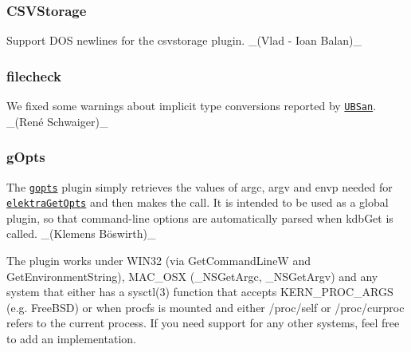 \subsubsection*{C\+S\+V\+Storage}


\begin{DoxyItemize}
\item Support D\+OS newlines for the csvstorage plugin. \+\_\+(Vlad -\/ Ioan Balan)\+\_\+
\end{DoxyItemize}

\subsubsection*{filecheck}


\begin{DoxyItemize}
\item We fixed some warnings about implicit type conversions reported by \href{https://clang.llvm.org/docs/UndefinedBehaviorSanitizer.html}{\tt U\+B\+San}. \+\_\+(René Schwaiger)\+\_\+
\end{DoxyItemize}

\subsubsection*{g\+Opts}


\begin{DoxyItemize}
\item The \href{https://www.libelektra.org/plugins/gopts}{\tt gopts} plugin simply retrieves the values of {\ttfamily argc}, {\ttfamily argv} and {\ttfamily envp} needed for \href{https://www.libelektra.org/tutorials/command-line-options}{\tt {\ttfamily elektra\+Get\+Opts}} and then makes the call. It is intended to be used as a global plugin, so that command-\/line options are automatically parsed when {\ttfamily kdb\+Get} is called. \+\_\+(Klemens Böswirth)\+\_\+
\item The plugin works under W\+I\+N32 (via {\ttfamily Get\+Command\+LineW} and {\ttfamily Get\+Environment\+String}), M\+A\+C\+\_\+\+O\+SX ({\ttfamily \+\_\+\+N\+S\+Get\+Argc}, {\ttfamily \+\_\+\+N\+S\+Get\+Argv}) and any system that either has a {\ttfamily sysctl(3)} function that accepts {\ttfamily K\+E\+R\+N\+\_\+\+P\+R\+O\+C\+\_\+\+A\+R\+GS} (e.\+g. Free\+B\+SD) or when {\ttfamily procfs} is mounted and either {\ttfamily /proc/self} or {\ttfamily /proc/curproc} refers to the current process. If you need support for any other systems, feel free to add an implementation.
\end{DoxyItemize}

